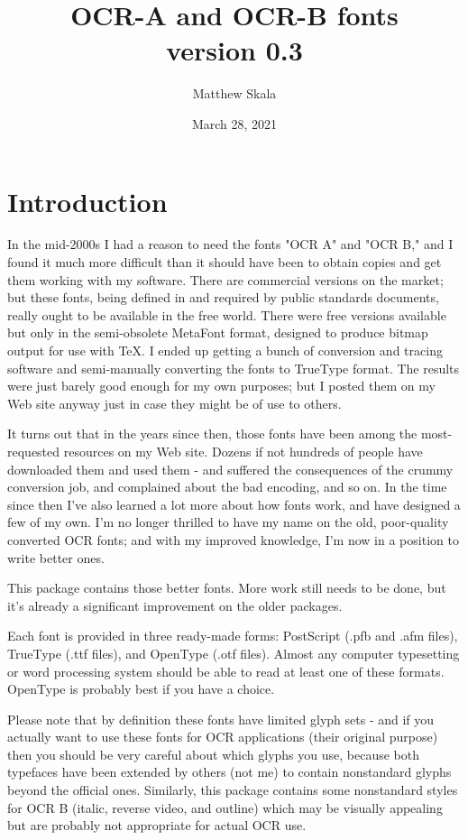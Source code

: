 \documentclass{article}
\title{OCR-A and OCR-B fonts\\version 0.3}
\author{Matthew Skala}
\date{March 28, 2021}
\begin{document}
\setmainfont{OCRB.otf}
\setmonofont{OCRB.otf}

\maketitle

\section{Introduction}

In the mid-2000s I had a reason to need the fonts "OCR A" and "OCR B," and I
found it much more difficult than it should have been to obtain copies and
get them working with my software.  There are commercial versions on the
market; but these fonts, being defined in and required by public standards
documents, really ought to be available in the free world.  There were free
versions available but only in the semi-obsolete MetaFont format, designed
to produce bitmap output for use with TeX\@.  I ended up getting a bunch of
conversion and tracing software and semi-manually converting the fonts to
TrueType format.  The results were just barely good enough for my own
purposes; but I posted them on my Web site anyway just in case they might be
of use to others.

It turns out that in the years since then, those fonts have been among the
most-requested resources on my Web site.  Dozens if not hundreds of people
have downloaded them and used them - and suffered the consequences of the
crummy conversion job, and complained about the bad encoding, and so on.  In
the time since then I've also learned a lot more about how fonts work, and
have designed a few of my own.  I'm no longer thrilled to have my name on
the old, poor-quality converted OCR fonts; and with my improved knowledge,
I'm now in a position to write better ones.

This package contains those better fonts.  More work still needs to be done,
but it's already a significant improvement on the older packages.

Each font is provided in three ready-made forms:  PostScript (.pfb and .afm
files), TrueType (.ttf files), and OpenType (.otf files).  Almost any
computer typesetting or word processing system should be able to read at
least one of these formats.  OpenType is probably best if you have a choice.

Please note that by definition these fonts have limited glyph sets - and
if you actually want to use these fonts for OCR applications (their original
purpose) then you should be very careful about which glyphs you use, because
both typefaces have been extended by others (not me) to contain nonstandard
glyphs beyond the official ones.  Similarly, this package contains some
nonstandard styles for OCR B (italic, reverse video, and outline) which
may be visually appealing but are probably not appropriate for actual
OCR use.
\end{document}
